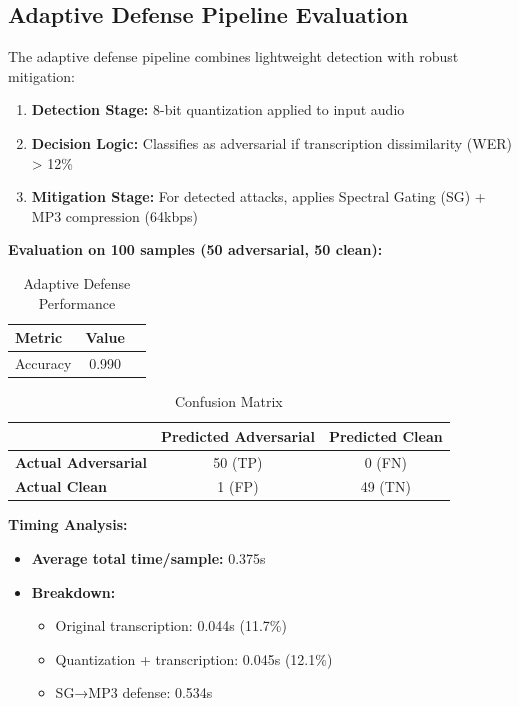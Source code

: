 \documentclass[../main.tex]{subfiles}
\begin{document}
\subsection{Adaptive Defense Pipeline Evaluation}
\label{subsec:adaptive_defense}

The adaptive defense pipeline combines lightweight detection with robust mitigation:
\begin{enumerate}
    \item \textbf{Detection Stage:} 8-bit quantization applied to input audio
    \item \textbf{Decision Logic:} Classifies as adversarial if transcription dissimilarity (WER) > 12\%
    \item \textbf{Mitigation Stage:} For detected attacks, applies Spectral Gating (SG) + MP3 compression (64kbps)
\end{enumerate}

\textbf{Evaluation on 100 samples (50 adversarial, 50 clean):}

\begin{table}[H]
\centering
\caption{Adaptive Defense Performance}
\label{tab:adaptive_defense}
\begin{tabular}{lcc}
\toprule
\textbf{Metric} & \textbf{Value} \\
\midrule
Accuracy & 0.990 \\
\bottomrule
\end{tabular}
\end{table}

\begin{table}[H]
\centering
\caption{Confusion Matrix}
\label{tab:adaptive_confusion}
\begin{tabular}{lcc}
\toprule
& \textbf{Predicted Adversarial} & \textbf{Predicted Clean} \\
\midrule
\textbf{Actual Adversarial} & 50 (TP) & 0 (FN) \\
\textbf{Actual Clean} & 1 (FP) & 49 (TN) \\
\bottomrule
\end{tabular}
\end{table}

\noindent\textbf{Timing Analysis:}
\begin{itemize}
    \item \textbf{Average total time/sample:} 0.375s
    \item \textbf{Breakdown:}
    \begin{itemize}
        \item Original transcription: 0.044s (11.7\%)
        \item Quantization + transcription: 0.045s (12.1\%)
        \item SG→MP3 defense: 0.534s
    \end{itemize}
\end{itemize}
\end{document}
